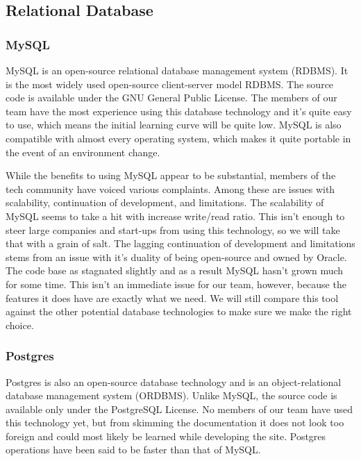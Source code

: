 

\subsection{Relational Database}

\subsubsection{MySQL}
MySQL is an open-source relational database management system (RDBMS). 
It is the most widely used open-source client-server model RDBMS. 
The source code is available under the GNU General Public License. 
The members of our team have the most experience using this database technology and it’s quite easy to use, which means the initial learning curve will be quite low. 
MySQL is also compatible with almost every operating system, which makes it quite portable in the event of an environment change. 

While the benefits to using MySQL appear to be substantial, members of the tech community have voiced various complaints. 
Among these are issues with scalability, continuation of development, and limitations. 
The scalability of MySQL seems to take a hit with increase write/read ratio. 
This isn’t enough to steer large companies and start-ups from using this technology, so we will take that with a grain of salt. 
The lagging continuation of development and limitations stems from an issue with it’s duality of being open-source and owned by Oracle. 
The code base as stagnated slightly and as a result MySQL hasn’t grown much for some time. 
This isn’t an immediate issue for our team, however, because the features it does have are exactly what we need. 
We will still compare this tool against the other potential database technologies to make sure we make the right choice. 

\subsubsection{Postgres}
Postgres is also an open-source database technology and is an object-relational database management system (ORDBMS). 
Unlike MySQL, the source code is available only under the PostgreSQL License. 
No members of our team have used this technology yet, but from skimming the documentation it does not look too foreign and could most likely be learned while developing the site. 
Postgres operations have been said to be faster than that of MySQL.


